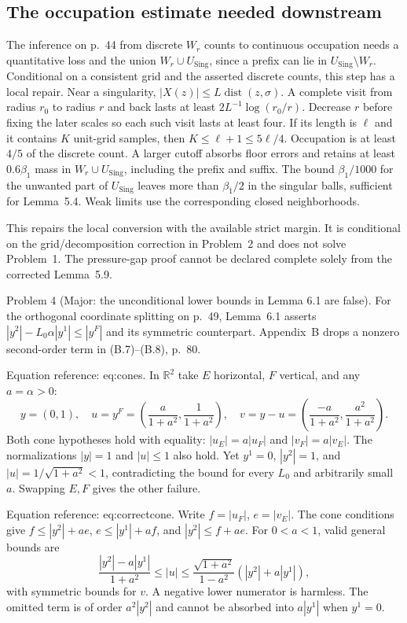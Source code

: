 \documentclass[10pt]{article}
\begin{document}
\subsection*{The occupation estimate needed downstream}
The inference on p. 44 from discrete \(W_r\) counts to continuous occupation needs a quantitative loss and the union \(W_r\cup U_{\operatorname{Sing}}\), since a prefix can lie in \(U_{\operatorname{Sing}}\setminus W_r\). Conditional on a consistent grid and the asserted discrete counts, this step has a local repair. Near a singularity, \(|X(z)|\le L\operatorname{dist}(z,\sigma)\). A complete visit from radius \(r_0\) to radius \(r\) and back lasts at least \(2L^{-1}\log(r_0/r)\). Decrease \(r\) before fixing the later scales so each such visit lasts at least four. If its length is \(\ell\) and it contains \(K\) unit-grid samples, then \(K\le\ell+1\le5\ell/4\). Occupation is at least \(4/5\) of the discrete count. A larger cutoff absorbs floor errors and retains at least \(0.6\beta_1\) mass in \(W_r\cup U_{\operatorname{Sing}}\), including the prefix and suffix. The bound \(\beta_1/1000\) for the unwanted part of \(U_{\operatorname{Sing}}\) leaves more than \(\beta_1/2\) in the singular balls, sufficient for Lemma 5.4. Weak limits use the corresponding closed neighborhoods.\par
This repairs the local conversion with the available strict margin. It is conditional on the grid/decomposition correction in Problem 2 and does not solve Problem 1. The pressure-gap proof cannot be declared complete solely from the corrected Lemma 5.9.\par
Problem 4 (Major: the unconditional lower bounds in Lemma 6.1 are false).  For the orthogonal coordinate splitting on p. 49, Lemma 6.1 asserts \(|y^2|-L_0\alpha|y^1|\le |y^F|\) and its symmetric counterpart. Appendix B drops a nonzero second-order term in (B.7)–(B.8), p. 80.\par
Equation reference: eq:cones. In \(\mathbb R^2\) take \(E\) horizontal, \(F\) vertical, and any \(a=\alpha>0\): \[y=(0,1),\quad
 u=y^F=\left(\frac{a}{1+a^2},\frac1{1+a^2}\right),\quad
 v=y-u=\left(\frac{-a}{1+a^2},\frac{a^2}{1+a^2}\right).
 \] Both cone hypotheses hold with equality: \(|u_E|=a|u_F|\) and \(|v_F|=a|v_E|\). The normalizations \(|y|=1\) and \(|u|\le1\) also hold. Yet \(y^1=0\), \(|y^2|=1\), and \(|u|=1/\sqrt{1+a^2}<1\), contradicting the bound for every \(L_0\) and arbitrarily small \(a\). Swapping \(E,F\) gives the other failure.\par
Equation reference: eq:correctcone. Write \(f=|u_F|\), \(e=|v_E|\). The cone conditions give \(f\le |y^2|+ae\), \(e\le |y^1|+af\), and \(|y^2|\le f+ae\). For \(0<a<1\), valid general bounds are \[\frac{|y^2|-a|y^1|}{1+a^2}
 \le |u|
 \le \frac{\sqrt{1+a^2}}{1-a^2}(|y^2|+a|y^1|),
 \] with symmetric bounds for \(v\). A negative lower numerator is harmless. The omitted term is of order \(a^2|y^2|\) and cannot be absorbed into \(a|y^1|\) when \(y^1=0\).\par
\end{document}
